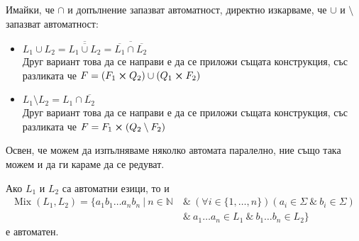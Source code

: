 Имайки, че $\cap$ и допълнение запазват автоматност, директно изкарваме, че $\cup$ и $\setminus$ запазват автоматност:
\begin{itemize}
    \item $L_1 \cup L_2 = \overline{\overline{L_1 \cup L_2}} = \overline{\overline{L_1} \cap \overline{L_2}}$ \\
          Друг вариант това да се направи е да се приложи същата конструкция, със разликата че $F = (F_1 \cross Q_2) \cup (Q_1 \cross F_2)$
    \item $L_1 \setminus L_2 = L_1 \cap \overline{L_2}$ \\
          Друг вариант това да се направи е да се приложи същата конструкция, със разликата че $F = F_1 \cross (Q_2 \setminus F_2)$
\end{itemize}

\pagebreak

Освен, че можем да изпълняваме няколко автомата паралелно, ние също така можем и да ги караме да се редуват.

\begin{claim}
    Ако $L_1$ и $L_2$ са автоматни езици, то и
    \begin{align*}
        \operatorname{Mix}(L_1, L_2) = \{ a_1b_1 \dots a_nb_n \: | \: n \in \mathbb{N} \: & \& \: (\forall i \in \{ 1, \dots, n \})(a_i \in \Sigma \: \& \: b_i \in \Sigma) \: \\
                                                                                          & \& \: a_1 \dots a_n \in L_1 \: \& \: b_1 \dots b_n \in L_2 \}
    \end{align*}
    е автоматен.
\end{claim}

